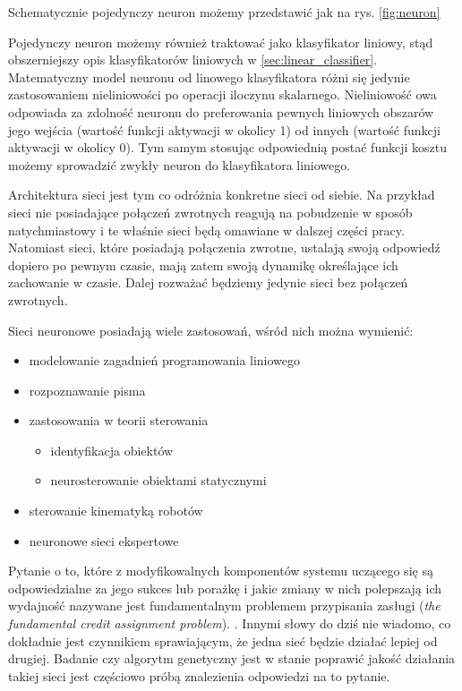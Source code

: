 Schematycznie pojedynczy neuron możemy przedstawić jak na rys. \ref{fig:neuron}

Pojedynczy neuron możemy również traktować jako klasyfikator liniowy, stąd obszerniejszy opis klasyfikatorów liniowych w \ref{sec:linear_classifier}.
Matematyczny model neuronu od linowego klasyfikatora różni się jedynie zastosowaniem nieliniowości po operacji iloczynu skalarnego.
Nieliniowość owa odpowiada za zdolność neuronu do preferowania pewnych liniowych obszarów jego wejścia (wartość funkcji aktywacji w okolicy 1) od innych (wartość funkcji aktywacji w okolicy 0).
Tym samym stosując odpowiednią postać funkcji kosztu możemy sprowadzić zwykły neuron do klasyfikatora liniowego. \cite{cs231n}

Architektura sieci jest tym co odróżnia konkretne sieci od siebie.
Na przykład sieci nie posiadające połączeń zwrotnych reagują na pobudzenie w sposób natychmiastowy i te właśnie sieci będą omawiane w dalszej części pracy.
Natomiast sieci, które posiadają połączenia zwrotne, ustalają swoją odpowiedź dopiero po pewnym czasie, mają zatem swoją dynamikę określające ich zachowanie w czasie. \cite{zuradabarskijedruch1996}
Dalej rozważać będziemy jedynie sieci bez połączeń zwrotnych.

Sieci neuronowe posiadają wiele zastosowań, wśród nich można wymienić:
\begin{itemize}
	\item modelowanie zagadnień programowania liniowego
	\item rozpoznawanie pisma
	\item zastosowania w teorii sterowania
	\begin{itemize}
		\item identyfikacja obiektów
		\item neurosterowanie obiektami statycznymi
	\end{itemize}
	\item sterowanie kinematyką robotów
	\item neuronowe sieci ekspertowe \cite{zuradabarskijedruch1996}
\end{itemize}

Pytanie o to, które z modyfikowalnych komponentów systemu uczącego się są odpowiedzialne za jego sukces lub porażkę i jakie zmiany w nich polepszają ich wydajność nazywane jest fundamentalnym problemem przypisania zasługi (\textit{the fundamental credit assignment problem}). \cite{SCHMIDHUBER201585}.
Innymi słowy do dziś nie wiadomo, co dokładnie jest czynnikiem sprawiającym, że jedna sieć będzie działać lepiej od drugiej.
Badanie czy algorytm genetyczny jest w stanie poprawić jakość działania takiej sieci jest częściowo próbą znalezienia odpowiedzi na to pytanie.

